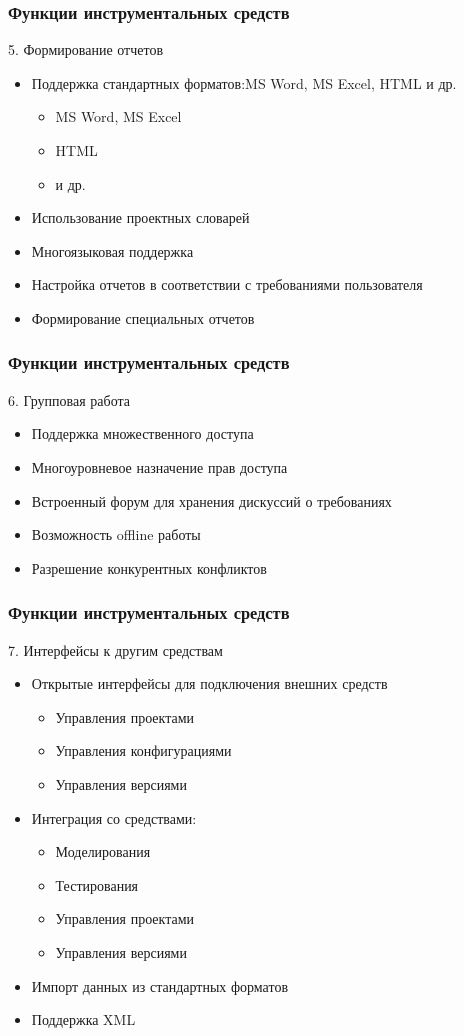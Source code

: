 \documentclass{../industrial-development}
\begin{document}
\begin{frame} \frametitle{Функции инструментальных средств}
5. Формирование отчетов
	\begin{itemize}
\item Поддержка стандартных форматов:MS Word, MS Excel, HTML и др.
		\begin{itemize}
	\item MS Word, MS Excel
	\item HTML 
	\item и др.
  		\end{itemize}
\item Использование проектных словарей
\item Многоязыковая поддержка
\item Настройка отчетов в соответствии с требованиями пользователя
\item Формирование специальных отчетов
  	\end{itemize}
\end{frame}


\begin{frame} \frametitle{Функции инструментальных средств}
6. Групповая работа
	\begin{itemize}
\item Поддержка множественного доступа
\item Многоуровневое назначение прав доступа
\item Встроенный форум для хранения дискуссий о требованиях
\item Возможность offline работы
\item Разрешение конкурентных конфликтов
  	\end{itemize}
\end{frame}


\begin{frame} \frametitle{Функции инструментальных средств}
7. Интерфейсы к другим средствам
	\begin{itemize}
\item Открытые интерфейсы для подключения внешних средств
		\begin{itemize}
	\item Управления проектами
	\item Управления конфигурациями
	\item Управления версиями
  		\end{itemize}
\item Интеграция со средствами:
		\begin{itemize}
	\item Моделирования
	\item Тестирования
	\item Управления проектами
	\item Управления версиями
  		\end{itemize}
\item Импорт данных из стандартных форматов
\item Поддержка XML
  	\end{itemize}
\end{frame}
\end{document}
